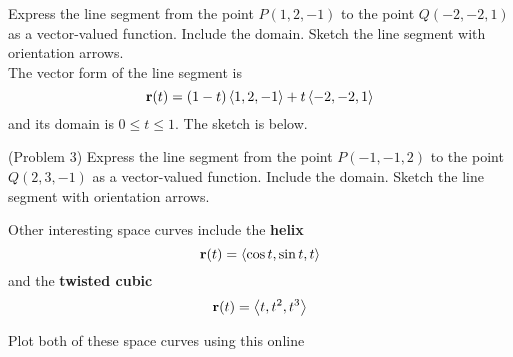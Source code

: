 \documentclass[handout]{ximera}
\begin{document}
\begin{example}[Example 3]
Express the line segment from the point $P(1, 2, -1)$ to the point $Q(-2, -2, 1)$ as a vector-valued function.  
Include the domain. Sketch the line segment with orientation arrows.\\
The vector form of the line segment is
\[
\mathbf r(t) = (1-t)\left\langle 1, 2, -1\right\rangle + t \left\langle -2, -2, 1\right\rangle
\]
and its domain is $0 \leq t \leq 1$. The sketch is below.




\begin{image}
\end{image}


\end{example}



\begin{problem}(Problem 3)
Express the line segment from the point $P(-1, -1, 2)$ to the point $Q(2, 3, -1)$ as a vector-valued function.  
Include the domain. Sketch the line segment with orientation arrows.
\end{problem}



Other interesting space curves include the \textbf{helix}
\[
\mathbf r(t) = \left\langle \cos t, \sin t, t\right\rangle
\]
and the \textbf{twisted cubic}
\[
\mathbf r(t) = \left\langle t, t^2, t^3\right\rangle
\]

Plot both of these space curves using this online 
\end{document}
